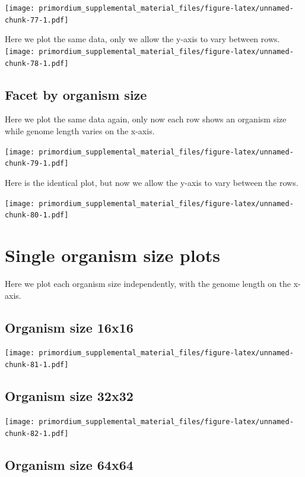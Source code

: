 \documentclass[
]{book}
\begin{document}
\texttt{[image: primordium\_supplemental\_material\_files/figure-latex/unnamed-chunk-77-1.pdf]}

Here we plot the same data, only we allow the y-axis to vary between rows.
\texttt{[image: primordium\_supplemental\_material\_files/figure-latex/unnamed-chunk-78-1.pdf]}

\hypertarget{facet-by-organism-size-2}{%
\subsection{Facet by organism size}\label{facet-by-organism-size-2}}

Here we plot the same data again, only now each row shows an organism size while genome length varies on the x-axis.

\texttt{[image: primordium\_supplemental\_material\_files/figure-latex/unnamed-chunk-79-1.pdf]}

Here is the identical plot, but now we allow the y-axis to vary between the rows.

\texttt{[image: primordium\_supplemental\_material\_files/figure-latex/unnamed-chunk-80-1.pdf]}

\hypertarget{single-organism-size-plots-3}{%
\section{Single organism size plots}\label{single-organism-size-plots-3}}

Here we plot each organism size independently, with the genome length on the x-axis.

\hypertarget{organism-size-16x16-2}{%
\subsection{Organism size 16x16}\label{organism-size-16x16-2}}

\texttt{[image: primordium\_supplemental\_material\_files/figure-latex/unnamed-chunk-81-1.pdf]}

\hypertarget{organism-size-32x32-2}{%
\subsection{Organism size 32x32}\label{organism-size-32x32-2}}

\texttt{[image: primordium\_supplemental\_material\_files/figure-latex/unnamed-chunk-82-1.pdf]}

\hypertarget{organism-size-64x64-2}{%
\subsection{Organism size 64x64}\label{organism-size-64x64-2}}
\end{document}

